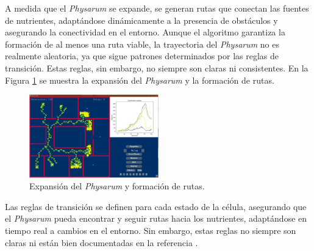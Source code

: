     \vskip 0.5cm
    A medida que el \textit{Physarum} se expande, se generan rutas que conectan las fuentes de nutrientes, 
        adapt\'andose din\'amicamente a la presencia de obst\'aculos y asegurando la conectividad en el entorno. Aunque el 
        algoritmo garantiza la formaci\'on de al menos una ruta viable, la trayectoria del \textit{Physarum} no es 
        realmente aleatoria, ya que sigue patrones determinados por las reglas de transici\'on. Estas reglas, sin embargo,
        no siempre son claras ni consistentes. En la Figura \ref{fig:expansion} se muestra la expansi\'on del \textit{Physarum} y la formaci\'on de rutas.
    \vskip 0.5cm
    \begin{figure}[h]
        \centering
        \includegraphics[width=0.5\textwidth]{./images/estado_del_arte/physarum/expansionOlvera.png}
        \caption{Expansi\'on del \textit{Physarum} y formaci\'on de rutas. \cite{Olvera2023}}
        \label{fig:expansion}
    \end{figure}
    \vskip 0.5cm
    Las reglas de transici\'on se definen para cada estado de la c\'elula, 
        asegurando que el \textit{Physarum} pueda encontrar y seguir rutas hacia los nutrientes, 
        adapt\'andose en tiempo real a cambios en el entorno. Sin embargo, estas reglas no 
        siempre son claras ni est\'an bien documentadas en la referencia \cite{Olvera2023}.

